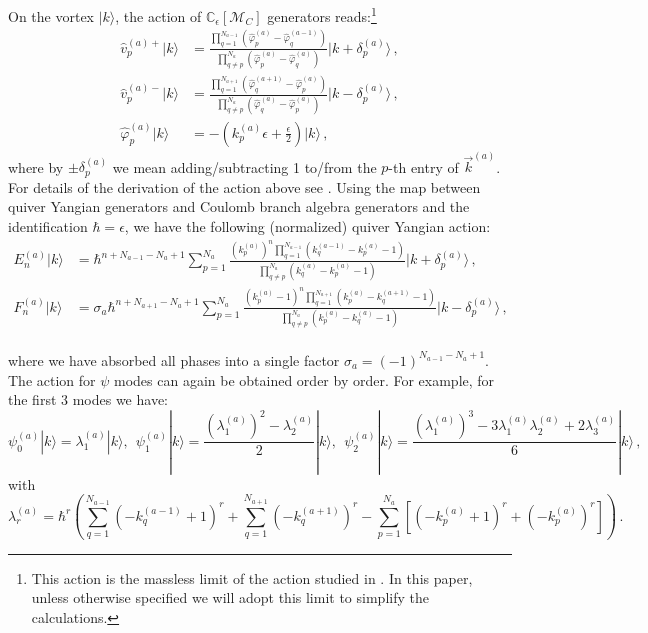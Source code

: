 \documentclass[12pt,a4paper]{article}
\newcommand{\eps}{\epsilon}
\begin{document}
On the vortex $|k\rangle$, the action of $\mathbb C_\eps[\mathcal M_C]$ generators reads:\footnote{This action is the massless limit of the action studied in \cite{BullimoreEtAl2018,ChenLi2026}. In this paper, unless otherwise specified we will adopt this limit to simplify the calculations.}
\begin{equation}
\begin{aligned}
\hat{v}_{p}^{(a)+} |k\rangle&=\frac{\prod_{q=1}^{N_{a-1}}(\hat{\varphi}^{(a)}_{p}-\hat{\varphi}^{(a-1)}_{q})}{\prod_{q\neq p}^{N_{a}}(\hat{\varphi}^{(a)}_{p}-\hat{\varphi}^{(a)}_{q})}|k+\delta^{(a)}_{p}\rangle\,,\\
\hat{v}_{p}^{(a)-} |k\rangle&=\frac{\prod_{q=1}^{N_{a+1}}(\hat{\varphi}^{(a+1)}_{q}-\hat{\varphi}^{(a)}_{p})}{\prod_{q\neq p}^{N_{a}}(\hat{\varphi}^{(a)}_{q}-\hat{\varphi}^{(a)}_{p})}|k-\delta^{(a)}_{p}\rangle\,,\\
\hat{\varphi}^{(a)}_p|k\rangle&=-(k^{(a)}_p\eps+\frac{\eps}{2})|k\rangle \,,
\end{aligned}
\end{equation}
where by $\pm \delta^{(a)}_{p}$ we mean adding/subtracting 1 to/from the $p$-th entry of $\vec k^{(a)}$. For details of the derivation of the action above see \cite[section 3]{ChenLi2026}. Using the map between quiver Yangian generators and Coulomb branch algebra generators and the identification $\hbar=\eps$, we have the following (normalized) quiver Yangian action: 
{\small
\begin{equation}
    \begin{aligned}
        E^{(a)}_n|k\rangle&=
        \hbar^{n+N_{a-1}-N_a+1}\sum_{p=1}^{N_a} 
        \frac{(k^{(a)}_p)^n\prod_{q=1}^{N_{a-1}}(k^{(a-1)}_q-k^{(a)}_p-1)}{\prod_{q\neq p}^{N_{a}}(k^{(a)}_q-k^{(a)}_p-1)}|k+\delta^{(a)}_{p}\rangle\,,\\
        F^{(a)}_n|k\rangle&=
        \sigma_a\hbar^{n+N_{a+1}-N_a+1}\sum_{p=1}^{N_a} 
        \frac{(k^{(a)}_p-1)^n\prod_{q=1}^{N_{a+1}}(k^{(a)}_p-k^{(a+1)}_q-1)}{\prod_{q\neq p}^{N_{a}}(k^{(a)}_p-k^{(a)}_q-1)}|k-\delta^{(a)}_{p}\rangle\,,\\
    \end{aligned}
    \label{eq:normailzed-EF- action}
\end{equation}}

\noindent where we have absorbed all phases into a single factor $\sigma_a=(-1)^{N_{a-1}-N_a+1}$. The action for $\psi$ modes can again be obtained order by order. For example, for the first 3 modes we have:
{\small
\begin{equation}
\label{eq:psi-action}
    \psi^{(a)}_0|k\rangle=\lambda^{(a)}_1|k\rangle,\ \ \psi^{(a)}_1|k\rangle=\frac{(\lambda^{(a)}_1)^2-\lambda^{(a)}_2}{2}|k\rangle, \ \ \psi^{(a)}_2|k\rangle=\frac{(\lambda^{(a)}_1)^3-3\lambda^{(a)}_1 \lambda^{(a)}_2 +2 \lambda^{(a)}_3}{6}|k\rangle \,,
\end{equation}}
with 
{\small
\begin{equation}
    \lambda^{(a)}_r=\hbar^r\left(\sum_{q=1}^{N_{a-1}}(-k^{(a-1)}_q+1)^r+\sum_{q=1}^{N_{a+1}}(-k^{(a+1)}_q)^r-\sum_{p=1}^{N_{a}}\left[(-k^{(a)}_p+1)^r+(-k^{(a)}_p)^r\right]\right)\,.
\end{equation}}
\end{document}
